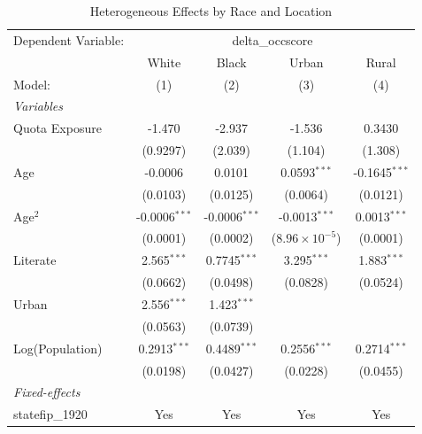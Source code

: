 
\begin{table}[htbp]
   \caption{\label{tab:heterogeneity} Heterogeneous Effects by Race and Location}
   \centering
   \begin{tabular}{lcccc}
      \tabularnewline \midrule \midrule
      Dependent Variable: & \multicolumn{4}{c}{delta\_occscore}\\
                      & White           & Black           & Urban                   & Rural \\   
      Model:          & (1)             & (2)             & (3)                     & (4)\\  
      \midrule
      \emph{Variables}\\
      Quota Exposure  & -1.470          & -2.937          & -1.536                  & 0.3430\\   
                      & (0.9297)        & (2.039)         & (1.104)                 & (1.308)\\   
      Age             & -0.0006         & 0.0101          & 0.0593$^{***}$          & -0.1645$^{***}$\\   
                      & (0.0103)        & (0.0125)        & (0.0064)                & (0.0121)\\   
      Age$^2$         & -0.0006$^{***}$ & -0.0006$^{***}$ & -0.0013$^{***}$         & 0.0013$^{***}$\\   
                      & (0.0001)        & (0.0002)        & ($8.96\times 10^{-5}$)  & (0.0001)\\   
      Literate        & 2.565$^{***}$   & 0.7745$^{***}$  & 3.295$^{***}$           & 1.883$^{***}$\\   
                      & (0.0662)        & (0.0498)        & (0.0828)                & (0.0524)\\   
      Urban           & 2.556$^{***}$   & 1.423$^{***}$   &                         &   \\   
                      & (0.0563)        & (0.0739)        &                         &   \\   
      Log(Population) & 0.2913$^{***}$  & 0.4489$^{***}$  & 0.2556$^{***}$          & 0.2714$^{***}$\\   
                      & (0.0198)        & (0.0427)        & (0.0228)                & (0.0455)\\   
      \midrule
      \emph{Fixed-effects}\\
      statefip\_1920  & Yes             & Yes             & Yes                     & Yes\\  

\end{tabular}
\end{table}

